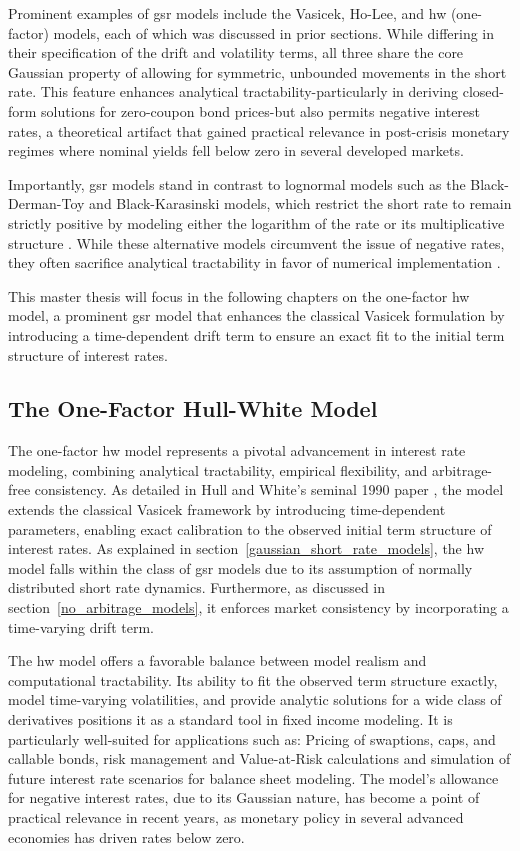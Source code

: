 Prominent examples of \ac{gsr} models include the Vasicek, Ho-Lee, and \ac{hw} (one-factor) models, each of which was discussed in prior sections. While differing in their specification of the drift and volatility terms, all three share the core Gaussian property of allowing for symmetric, unbounded movements in the short rate. This feature enhances analytical tractability-particularly in deriving closed-form solutions for zero-coupon bond prices-but also permits negative interest rates, a theoretical artifact that gained practical relevance in post-crisis monetary regimes where nominal yields fell below zero in several developed markets.

Importantly, \ac{gsr} models stand in contrast to lognormal models such as the Black-Derman-Toy and Black-Karasinski models, which restrict the short rate to remain strictly positive by modeling either the logarithm of the rate or its multiplicative structure . While these alternative models circumvent the issue of negative rates, they often sacrifice analytical tractability in favor of numerical implementation \parencite[p.~718]{hull2015optionsfutures}.

This master thesis will focus in the following chapters on the one-factor \ac{hw} model, a prominent \ac{gsr} model that enhances the classical Vasicek formulation by introducing a time-dependent drift term to ensure an exact fit to the initial term structure of interest rates.

\subsection{The One-Factor Hull-White Model}
The one-factor \ac{hw} model represents a pivotal advancement in interest rate modeling, combining analytical tractability, empirical flexibility, and arbitrage-free consistency. As detailed in Hull and White's seminal 1990 paper \parencite{hull1990pricing}, the model extends the classical Vasicek framework by introducing time-dependent parameters, enabling exact calibration to the observed initial term structure of interest rates. As explained in section~\ref{gaussian_short_rate_models}, the \ac{hw} model falls within the class of \ac{gsr} models due to its assumption of normally distributed short rate dynamics. Furthermore, as discussed in section~\ref{no_arbitrage_models}, it enforces market consistency by incorporating a time-varying drift term.

The \ac{hw} model offers a favorable balance between model realism and computational tractability. Its ability to fit the observed term structure exactly, model time-varying volatilities, and provide analytic solutions for a wide class of derivatives positions it as a standard tool in fixed income modeling. It is particularly well-suited for applications such as: Pricing of swaptions, caps, and callable bonds, risk management and Value-at-Risk calculations and simulation of future interest rate scenarios for balance sheet modeling. The model's allowance for negative interest rates, due to its Gaussian nature, has become a point of practical relevance in recent years, as monetary policy in several advanced economies has driven rates below zero.

